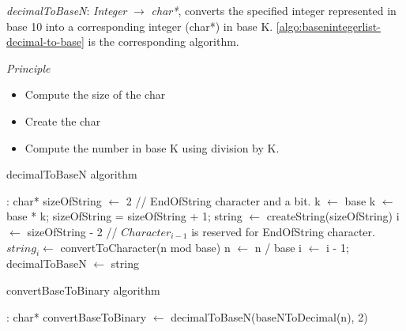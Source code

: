 \documentclass[book, nodocumentinfo]{upmethodology-document}
\begin{document}

\emph{decimalToBaseN}: \emph{Integer} \(\rightarrow\) \emph{char*},
converts the specified integer represented in base 10 into a corresponding integer (char*) in base K.
\ref{algo:basenintegerlist-decimal-to-base} is the corresponding algorithm.

\emph{Principle}
\begin{itemize}
    \item Compute the size of the char
    \item Create the char
    \item Compute the number in base K using division by K.
\end{itemize}

\begin{algorithm}[H]
    \label{algo:basenintegerlist-decimal-to-base}
    \caption{decimalToBaseN algorithm}

    \begin{algorithmic}
         : char*
            \State sizeOfString \(\leftarrow\) 2 // EndOfString character and a bit.
            \State k \(\leftarrow\) base
                \State k \(\leftarrow\) base * k;
                \State sizeOfString = sizeOfString + 1;
            \EndWhile
            \State string \(\leftarrow\) createString(sizeOfString)
            \State i \(\leftarrow\) sizeOfString - 2 // \(Character_{i-1}\) is reserved for EndOfString character.
            \Repeat
                \State \(string_{i} \leftarrow \) convertToCharacter(n mod base)
                \State n \(\leftarrow\) n / base
                \State i \(\leftarrow\) i - 1;
            \State decimalToBaseN \(\leftarrow\) string
        \EndFunction
    \end{algorithmic}
\end{algorithm}

\begin{algorithm}[H]
    \label{algo:basenintegerlist-convert-base-to-binary}
    \caption{convertBaseToBinary algorithm}

    \begin{algorithmic}
         : char*
            \State convertBaseToBinary \(\leftarrow\) decimalToBaseN(baseNToDecimal(n), 2)
        \EndFunction
    \end{algorithmic}
\end{algorithm}
\end{document}
